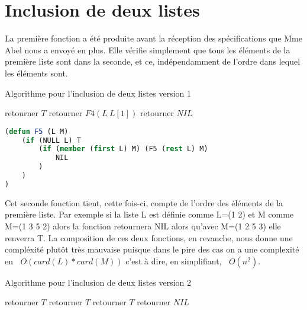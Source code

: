 \documentclass[a4paper, 12pt, leqno]{report}
\theoremstyle{plain}
\newcommand{\bigO}[1]{\ensuremath{\mathop{}\mathopen{}O\mathopen{}\left(#1\right)}}
\begin{document}
        \section{Inclusion de deux listes}
        La première fonction a été produite avant la réception des spécifications que Mme Abel nous a envoyé en plus. Elle vérifie simplement que tous les éléments de la première liste sont dans la seconde, et ce, indépendamment de l’ordre dans lequel les éléments sont.
                    \begin{algorithm}
            \caption{Algorithme pour l'inclusion de deux listes version 1}
            \begin{algorithmic}
                \State retourner $T$
                     \State retourner $F4(L \ L[1])$
            \Else                   
                    \State retourner $NIL$
            \EndIf        
            \end{algorithmic}
            \end{algorithm}
        \newpage
        \begin{lstlisting}[label=some-code,caption=F5 (N L) version recursive 1,language=lisp]
(defun F5 (L M) 
	(if (NULL L) T 
		(if (member (first L) M) (F5 (rest L) M) 
			NIL
		)
	)
)
            \end{lstlisting}
          Cet seconde fonction tient, cette fois-ci, compte de l’ordre des éléments de la première liste. Par exemple si la liste L est définie comme L=(1 2) et M comme M=(1 3 5 2) alors la fonction retournera NIL alors qu’avec M=(1 2 5 3) elle renverra T. La composition de ces deux fonctions, en revanche, nous donne une compléxité plutôt très mauvaise puisque dans le pire des cas on a une complexité en $\bigO{card(L)*card(M)}$ c’est à dire, en simplifiant, $\bigO{n^2}$.
          \begin{algorithm}
            \caption{Algorithme pour l'inclusion de deux listes version 2}
            \begin{algorithmic}
                \State retourner $T$
                     \State retourner $T$
                    \State retourner $T$
            \Else 
                    \State retourner $NIL$        
            \EndIf        
            \end{algorithmic}
            \end{algorithm}
            
\end{document}
